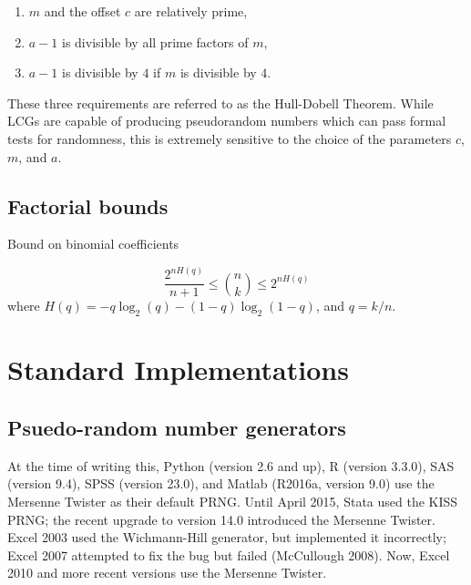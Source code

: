 \documentclass[12pt]{article}
\begin{document}
\begin{enumerate}
\item $m$ and the offset $c$ are relatively prime,
\item $a-1$ is divisible by all prime factors of $m$,
\item $a-1$ is divisible by $4$ if $m$ is divisible by $4$.
\end{enumerate}

These three requirements are referred to as the Hull-Dobell Theorem.
While LCGs are capable of producing pseudorandom numbers which can pass formal tests for randomness, this is extremely sensitive to the choice of the parameters $c$, $m$, and $a$.

\subsection{Factorial bounds}

Bound on binomial coefficients

$$ \frac{2^{nH(q)}}{n+1} \leq {n \choose k} \leq 2^{nH(q)}$$
where $H(q) = -q \log_2(q) - (1-q)\log_2(1-q)$, and $q = k/n$.


\section{Standard Implementations}
\subsection{Psuedo-random number generators}
At the time of writing this, Python (version 2.6 and up), R (version 3.3.0), SAS (version 9.4), SPSS (version 23.0), and Matlab (R2016a, version 9.0) use the Mersenne Twister as their default PRNG.
Until April 2015, Stata used the KISS PRNG; the recent upgrade to version 14.0 introduced the Mersenne Twister.
Excel 2003 used the Wichmann-Hill generator, but implemented it incorrectly; Excel 2007 attempted to fix the bug but failed (McCullough 2008).
Now, Excel 2010 and more recent versions use the Mersenne Twister.
\end{document}
